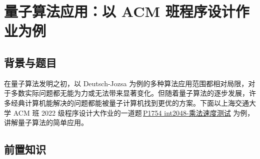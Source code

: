 \section{量子算法应用：以 ACM 班程序设计作业为例}

\subsection{背景与题目}

在量子算法发明之初，以 Deutsch-Jozsa 为例的多种算法应用范围都相对局限，对于多数实际问题都无能为力或无法带来显著变化。但随着量子算法的逐步发展，许多经典计算机能解决的问题都能被量子计算机找到更优的方案。下面以上海交通大学 ACM 班 2022 级程序设计大作业的一道题\,\href{https://acm.sjtu.edu.cn/OnlineJudge/problem?problem_id=1754}{P1754 int2048-乘法速度测试} 为例，讲解量子算法的简单应用。

\subsection{前置知识}

